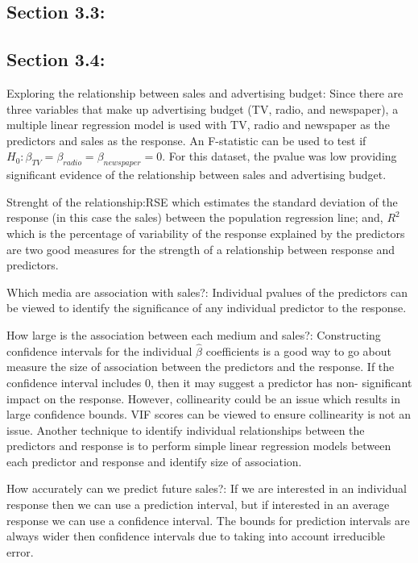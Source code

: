 \documentclass[
]{article}
\begin{document}
\hypertarget{section-3.3}{%
\subsection{Section 3.3:}\label{section-3.3}}

\hypertarget{section-3.4}{%
\subsection{Section 3.4:}\label{section-3.4}}

Exploring the relationship between sales and advertising budget: Since
there are three variables that make up advertising budget (TV, radio,
and newspaper), a multiple linear regression model is used with TV,
radio and newspaper as the predictors and sales as the response. An
F-statistic can be used to test if
\(H_0: \beta_{TV} = \beta_{radio} = \beta_{newspaper} = 0\). For this
dataset, the pvalue was low providing significant evidence of the
relationship between sales and advertising budget.

Strenght of the relationship:RSE which estimates the standard deviation
of the response (in this case the sales) between the population
regression line; and, \(R^2\) which is the percentage of variability of
the response explained by the predictors are two good measures for the
strength of a relationship between response and predictors.

Which media are association with sales?: Individual pvalues of the
predictors can be viewed to identify the significance of any individual
predictor to the response.

How large is the association between each medium and sales?:
Constructing confidence intervals for the individual \(\hat{\beta}\)
coefficients is a good way to go about measure the size of association
between the predictors and the response. If the confidence interval
includes 0, then it may suggest a predictor has non- significant impact
on the response. However, collinearity could be an issue which results
in large confidence bounds. VIF scores can be viewed to ensure
collinearity is not an issue. Another technique to identify individual
relationships between the predictors and response is to perform simple
linear regression models between each predictor and response and
identify size of association.

How accurately can we predict future sales?: If we are interested in an
individual response then we can use a prediction interval, but if
interested in an average response we can use a confidence interval. The
bounds for prediction intervals are always wider then confidence
intervals due to taking into account irreducible error.
\end{document}
